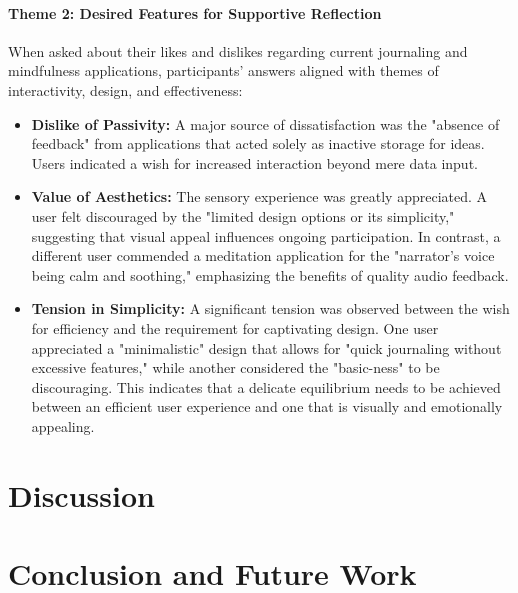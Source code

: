\documentclass[conference]{IEEEtran}
\begin{document}
	\paragraph{Theme 2: Desired Features for Supportive Reflection}
	When asked about their likes and dislikes regarding current journaling and mindfulness applications, participants' answers aligned with themes of interactivity, design, and effectiveness:
	\begin{itemize}
		\item \textbf{Dislike of Passivity:} A major source of dissatisfaction was the "absence of feedback" from applications that acted solely as inactive storage for ideas. Users indicated a wish for increased interaction beyond mere data input.
		\item \textbf{Value of Aesthetics:} The sensory experience was greatly appreciated. A user felt discouraged by the "limited design options or its simplicity," suggesting that visual appeal influences ongoing participation. In contrast, a different user commended a meditation application for the "narrator's voice being calm and soothing," emphasizing the benefits of quality audio feedback.
		\item \textbf{Tension in Simplicity:} A significant tension was observed between the wish for efficiency and the requirement for captivating design. One user appreciated a "minimalistic" design that allows for "quick journaling without excessive features," while another considered the "basic-ness" to be discouraging. This indicates that a delicate equilibrium needs to be achieved between an efficient user experience and one that is visually and emotionally appealing.
	\end{itemize}
	
	
	\section{Discussion}
	\section{Conclusion and Future Work}
	
\end{document}
